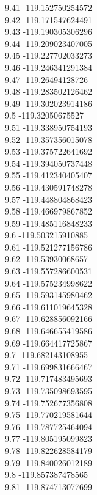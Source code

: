 {9.41	-119.152750254572\\
9.42	-119.171547624491\\
9.43	-119.190305306296\\
9.44	-119.209023407005\\
9.45	-119.227702033273\\
9.46	-119.246341291384\\
9.47	-119.26494128726\\
9.48	-119.283502126462\\
9.49	-119.302023914186\\
9.5	-119.32050675527\\
9.51	-119.338950754193\\
9.52	-119.357356015078\\
9.53	-119.375722641692\\
9.54	-119.394050737448\\
9.55	-119.412340405407\\
9.56	-119.430591748278\\
9.57	-119.448804868423\\
9.58	-119.466979867852\\
9.59	-119.485116848233\\
9.6	-119.503215910885\\
9.61	-119.521277156786\\
9.62	-119.53930068657\\
9.63	-119.557286600531\\
9.64	-119.575234998622\\
9.65	-119.593145980462\\
9.66	-119.611019645328\\
9.67	-119.628856092166\\
9.68	-119.646655419586\\
9.69	-119.664417725867\\
9.7	-119.682143108955\\
9.71	-119.699831666467\\
9.72	-119.717483495693\\
9.73	-119.735098693595\\
9.74	-119.752677356808\\
9.75	-119.770219581644\\
9.76	-119.787725464094\\
9.77	-119.805195099823\\
9.78	-119.822628584179\\
9.79	-119.840026012189\\
9.8	-119.857387478565\\
9.81	-119.874713077699\\
}
